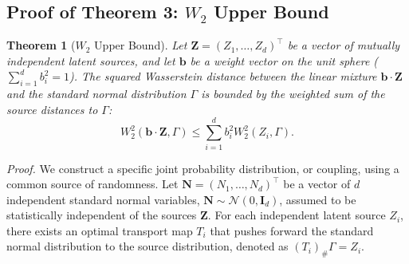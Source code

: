 \documentclass{tpm2026} %
\newtheorem{theorem}{Theorem}
\begin{document}
\subsection{Proof of Theorem 3: $W_2$ Upper Bound}
\begin{theorem}[$W_2$ Upper Bound]
Let $\mathbf{Z} = (Z_1, \dots, Z_d)^\top$ be a vector of mutually independent latent sources, and let $\mathbf{b}$ be a weight vector on the unit sphere ($\sum_{i=1}^d b_i^2 = 1$). The squared Wasserstein distance between the linear mixture $\mathbf{b} \cdot \mathbf{Z}$ and the standard normal distribution $\Gamma$ is bounded by the weighted sum of the source distances to $\Gamma$:
\begin{equation}
    W_2^2(\mathbf{b} \cdot \mathbf{Z}, \Gamma) \le \sum_{i=1}^d b_i^2 W_2^2(Z_i, \Gamma).
\end{equation}
\end{theorem}

\textit{Proof.} We construct a specific joint probability distribution, or coupling, using a common source of randomness. Let $\mathbf{N} = (N_1, \dots, N_d)^\top$ be a vector of $d$ independent standard normal variables, $\mathbf{N} \sim \mathcal{N}(0, \mathbf{I}_d)$, assumed to be statistically independent of the sources $\mathbf{Z}$. For each independent latent source $Z_i$, there exists an optimal transport map $T_i$ that pushes forward the standard normal distribution to the source distribution, denoted as $(T_i)_{\#} \Gamma = Z_i$. 
\end{document}
